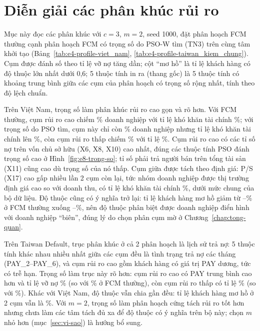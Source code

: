 \section{Diễn giải các phân khúc rủi ro}
\label{sec:dien-giai}

Mục này đọc các phân khúc với $c = 3$, $m = 2$, seed 1000, đặt phân hoạch FCM thường cạnh phân hoạch FCM có trọng số do
PSO-W tìm (TN3) trên cùng tâm khởi tạo (Bảng~\ref{tab:e4-profile-viet_nam}, \ref{tab:e4-profile-taiwan_kiem_chung}). Cụm được
đánh số theo tỉ lệ vỡ nợ tăng dần; cột ``mơ hồ'' là tỉ lệ khách hàng có độ thuộc lớn nhất dưới 0,6; 5 thuộc tính in ra (thang
gốc) là 5 thuộc tính có khoảng trung bình giữa các cụm của phân hoạch có trọng số rộng nhất, tính theo độ lệch chuẩn.



Trên Việt Nam, trọng số làm phân khúc rủi ro cao gọn và rõ hơn. Với FCM thường, cụm rủi ro cao chiếm
\soLieuEBonVietNamFcmKppCumBaCo\% doanh nghiệp với tỉ lệ khó khăn tài chính \soLieuEBonVietNamFcmKppCumBaVoNo\%; với trọng số do PSO tìm,
cụm này chỉ còn \soLieuEBonVietNamPsoTrongSoCumBaCo\% doanh nghiệp nhưng tỉ lệ khó khăn tài chính lên \soLieuEBonVietNamPsoTrongSoCumBaVoNo\%,
còn cụm rủi ro thấp chiếm \soLieuEBonVietNamPsoTrongSoCumMotCo\% với tỉ lệ \soLieuEBonVietNamPsoTrongSoCumMotVoNo\%. Cụm rủi ro
cao có các tỉ số nợ trên vốn chủ sở hữu (X6, X8, X10) cao nhất, đúng các thuộc tính PSO đánh trọng số cao ở
Hình~\ref{fig:e8-trong-so}; tỉ số phải trả người bán trên tổng tài sản (X11) cũng cao dù trọng số của nó thấp. Cụm giữa được tách theo định giá: P/S (X17) cao gấp nhiều lần 2 cụm
còn lại, tức nhóm doanh nghiệp được thị trường định giá cao so với doanh thu, có tỉ lệ khó khăn tài chính \soLieuEBonVietNamPsoTrongSoCumHaiVoNo\%,
dưới mức chung của bộ dữ liệu. Độ thuộc cũng có ý nghĩa trở lại: tỉ lệ khách hàng mơ hồ giảm từ \soLieuEBonVietNamFcmKppCumBaMoHo--\soLieuEBonVietNamFcmKppCumMotMoHo\% ở FCM thường
xuống \soLieuEBonVietNamPsoTrongSoCumMotMoHo--\soLieuEBonVietNamPsoTrongSoCumBaMoHo\%, nên độ thuộc phân biệt được doanh nghiệp
điển hình với doanh nghiệp ``biên'', đúng lý do chọn phân cụm mờ ở Chương~\ref{chap:tong-quan}.



Trên Taiwan Default, trục phân khúc ở cả 2 phân hoạch là lịch sử trả nợ: 5 thuộc tính khác nhau nhiều nhất giữa các cụm đều
là tình trạng trả nợ các tháng (PAY\_2--PAY\_6), và cụm rủi ro cao gồm khách hàng có giá trị PAY dương, tức có trễ hạn. Trọng số
làm trục này rõ hơn: cụm rủi ro cao có PAY trung bình cao hơn và tỉ lệ vỡ nợ \soLieuEBonTaiwanKiemChungPsoTrongSoCumBaVoNo\%
(so với \soLieuEBonTaiwanKiemChungFcmKppCumBaVoNo\% ở FCM thường), còn cụm rủi ro thấp có tỉ lệ
\soLieuEBonTaiwanKiemChungPsoTrongSoCumMotVoNo\% (so với \soLieuEBonTaiwanKiemChungFcmKppCumMotVoNo\%). Khác với Việt Nam, độ
thuộc vẫn chia gần đều: tỉ lệ khách hàng mơ hồ ở 2 cụm vẫn là \soLieuEBonTaiwanKiemChungPsoTrongSoCumBaMoHo\%. Với $m = 2$, trọng
số làm phân hoạch cứng tách rủi ro tốt hơn nhưng chưa làm các tâm tách đủ xa để độ thuộc có ý nghĩa trên bộ này; chọn $m$ nhỏ
hơn (mục~\ref{sec:vi-sao}) là hướng bổ sung.

